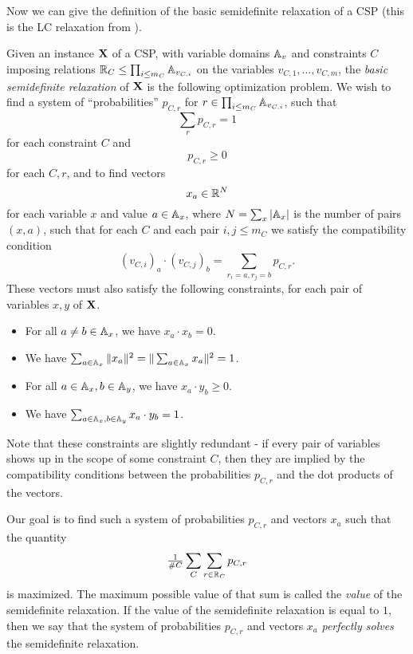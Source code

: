 \documentclass[letterpaper,11pt]{article}
\begin{document}
Now we can give the definition of the basic semidefinite relaxation of a CSP (this is the LC relaxation from \cite{raghavendra-thesis}).

\begin{defn} Given an instance $\mathbf{X}$ of a CSP, with variable domains $\mathbb{A}_v$ and constraints $C$ imposing relations $\mathbb{R}_C \le \prod_{i \le m_C} \mathbb{A}_{v_{C,i}}$ on the variables $v_{C,1}, ..., v_{C,m}$, the \emph{basic semidefinite relaxation} of $\mathbf{X}$ is the following optimization problem. We wish to find a system of ``probabilities'' $p_{C,r}$ for $r \in \prod_{i \le m_C} \mathbb{A}_{v_{C,i}}$, such that
\[
\sum_{r} p_{C,r} = 1
\]
for each constraint $C$ and
\[
p_{C,r} \ge 0
\]
for each $C,r$, and to find vectors
\[
x_a \in \mathbb{R}^N
\]
for each variable $x$ and value $a \in \mathbb{A}_x$, where $N = \sum_x |\mathbb{A}_x|$ is the number of pairs $(x,a)$, such that for each $C$ and each pair $i,j \le m_C$ we satisfy the compatibility condition
\[
(v_{C,i})_a \cdot (v_{C,j})_b = \sum_{r_i = a, r_j = b} p_{C,r}.
\]
These vectors must also satisfy the following constraints, for each pair of variables $x,y$ of $\mathbf{X}$.
\begin{itemize}
\item For all $a \ne b \in \mathbb{A}_x$, we have $x_a \cdot x_b = 0$.
\item We have $\sum_{a \in \mathbb{A}_x} \|x_a\|^2 = \|\sum_{a \in \mathbb{A}_x} x_a\|^2 = 1$.
\item For all $a \in \mathbb{A}_x, b \in \mathbb{A}_y$, we have $x_a \cdot y_b \ge 0$.
\item We have $\sum_{a \in \mathbb{A}_x, b \in \mathbb{A}_y} x_a \cdot y_b = 1$.
\end{itemize}
Note that these constraints are slightly redundant - if every pair of variables shows up in the scope of some constraint $C$, then they are implied by the compatibility conditions between the probabilities $p_{C,r}$ and the dot products of the vectors.

Our goal is to find such a system of probabilities $p_{C,r}$ and vectors $x_a$ such that the quantity
\[
\tfrac{1}{\#C}\sum_C \sum_{r \in \mathbb{R}_C} p_{C,r}
\]
is maximized. The maximum possible value of that sum is called the \emph{value} of the semidefinite relaxation. If the value of the semidefinite relaxation is equal to $1$, then we say that the system of probabilities $p_{C,r}$ and vectors $x_a$ \emph{perfectly solves} the semidefinite relaxation.
\end{defn}

\end{document}
